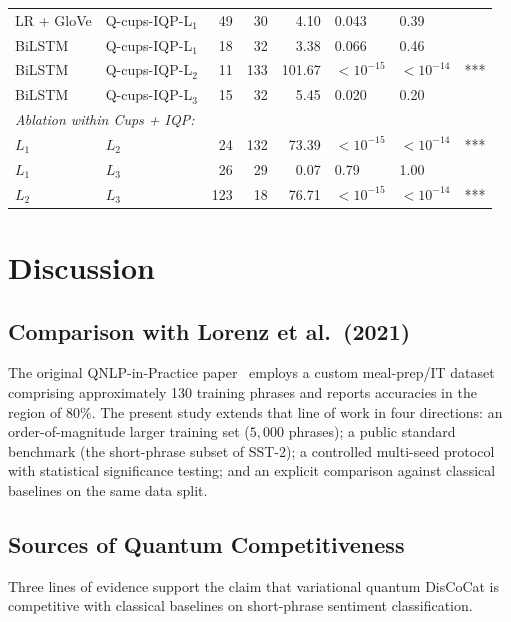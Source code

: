 \documentclass[runningheads]{llncs}
\begin{document}
\begin{table}[t]
\begin{tabular}{llrrrlll}
LR + GloVe   & Q-cups-IQP-L\(_1\) & 49 & 30  & 4.10   & 0.043     & 0.39     &     \\
BiLSTM       & Q-cups-IQP-L\(_1\) & 18 & 32  & 3.38   & 0.066     & 0.46     &     \\
BiLSTM       & Q-cups-IQP-L\(_2\) & 11 & 133 & 101.67 & \(< 10^{-15}\) & \(<10^{-14}\) & *** \\
BiLSTM       & Q-cups-IQP-L\(_3\) & 15 & 32  & 5.45   & 0.020     & 0.20     &     \\
\multicolumn{8}{l}{\emph{Ablation within Cups + IQP:}} \\
\(L_1\)      & \(L_2\)           & 24 & 132 & 73.39  & \(< 10^{-15}\) & \(<10^{-14}\) & *** \\
\(L_1\)      & \(L_3\)           & 26 & 29  & 0.07   & 0.79      & 1.00     &     \\
\(L_2\)      & \(L_3\)           & 123 & 18 & 76.71  & \(< 10^{-15}\) & \(<10^{-14}\) & *** \\
\bottomrule
\end{tabular}
\end{table}

\section{Discussion}\label{sec:discussion}

\subsection{Comparison with Lorenz et al.\ (2021)}

The original QNLP-in-Practice paper~\cite{lorenz2021} employs a
custom meal-prep/IT dataset comprising approximately 130 training
phrases and reports accuracies in the region of \(80\%\). The
present study extends that line of work in four directions: an
order-of-magnitude larger training set (\(5{,}000\) phrases); a
public standard benchmark (the short-phrase subset of SST-2); a
controlled multi-seed protocol with statistical significance testing;
and an explicit comparison against classical baselines on the same
data split.

\subsection{Sources of Quantum Competitiveness}

Three lines of evidence support the claim that variational quantum
DisCoCat is competitive with classical baselines on short-phrase
sentiment classification.
\end{document}
